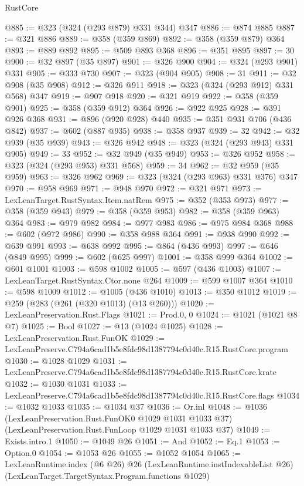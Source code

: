 \begin{lexlean}{RustCore}
\begin{coremodule}
@885 := @323 (@324 (@293 @879) @331 @344) @347
@886 := @874 @885
@887 := @321 @886
@889 := @358 (@359 @869)
@892 := @358 (@359 @879) @364
@893 := @889 @892
@895 := @509 @893 @368
@896 := @351 @895
@897 := 30
@900 := @32 @897 (@35 @897)
@901 := @326 @900
@904 := @324 (@293 @901) @331
@905 := @333 @730
@907 := @323 (@904 @905)
@908 := 31
@911 := @32 @908 (@35 @908)
@912 := @326 @911
@918 := @323 (@324 (@293 @912) @331 @568) @347
@919 := @907 @918
@920 := @321 @919
@922 := @358 (@359 @901)
@925 := @358 (@359 @912) @364
@926 := @922 @925
@928 := @391 @926 @368
@931 := @896 (@920 @928) @440
@935 := @351 @931 @706 (@436 @842)
@937 := @602 (@887 @935)
@938 := @358 @937
@939 := 32
@942 := @32 @939 (@35 @939)
@943 := @326 @942
@948 := @323 (@324 (@293 @943) @331 @905)
@949 := 33
@952 := @32 @949 (@35 @949)
@953 := @326 @952
@958 := @323 (@324 (@293 @953) @331 @568)
@959 := 34
@962 := @32 @959 (@35 @959)
@963 := @326 @962
@969 := @323 (@324 (@293 @963) @331 @376) @347
@970 := @958 @969
@971 := @948 @970
@972 := @321 @971
@973 := LexLeanTarget.RustSyntax.Item.natRem
@975 := @352 (@353 @973)
@977 := @358 (@359 @943)
@979 := @358 (@359 @953)
@982 := @358 (@359 @963) @364
@983 := @979 @982
@984 := @977 @983
@986 := @975 @984 @368
@988 := @602 (@972 @986)
@990 := @358 @988 @364
@991 := @938 @990
@992 := @639 @991
@993 := @638 @992
@995 := @864 (@436 @993)
@997 := @646 (@849 @995)
@999 := @602 (@625 @997)
@1001 := @358 @999 @364
@1002 := @601 @1001
@1003 := @598 @1002
@1005 := @597 (@436 @1003)
@1007 := LexLeanTarget.RustSyntax.Ctor.none @264
@1009 := @599 @1007 @364
@1010 := @598 @1009
@1012 := @1005 (@436 @1010)
@1013 := @350 @1012
@1019 := @259 (@283 (@261 (@320 @1013) (@13 @260)))
@1020 := LexLeanPreservation.Rust.Flags
@1021 := Prod.{0, 0}
@1024 := @1021 (@1021 @8 @7)
@1025 := Bool
@1027 := @13 (@1024 @1025)
@1028 := LexLeanPreservation.Rust.FunOK
@1029 := LexLeanPreserve.C794a6cad1b5e8fdc98d1387794c0d40c.R15.RustCore.program
@1030 := @1028 @1029
@1031 := LexLeanPreserve.C794a6cad1b5e8fdc98d1387794c0d40c.R15.RustCore.krate
@1032 := @1030 @1031
@1033 := LexLeanPreserve.C794a6cad1b5e8fdc98d1387794c0d40c.R15.RustCore.flags
@1034 := @1032 @1033
@1035 := @1034 @37
@1036 := Or.inl
@1048 := @1036
    (LexLeanPreservation.Rust.FunOK0 @1029 @1031 @1033 @37)
    (LexLeanPreservation.Rust.FunLoop @1029 @1031 @1033 @37)
@1049 := Exists.intro.{1}
@1050 := @1049 @26
@1051 := And
@1052 := Eq.{1}
@1053 := Option.{0}
@1054 := @1053 @26
@1055 := @1052 @1054
@1065 := LexLeanRuntime.index
    (@6 @26)
    @26
    (LexLeanRuntime.instIndexableList @26)
    (LexLeanTarget.TargetSyntax.Program.functions @1029)

\end{coremodule}
\end{lexlean}
